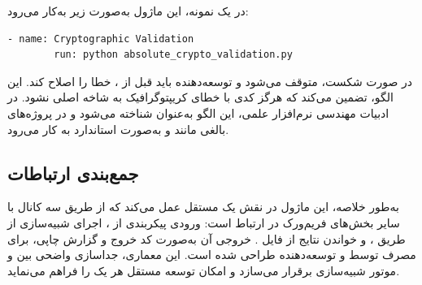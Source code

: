 در یک  نمونه، این ماژول به‌صورت زیر به‌کار می‌رود:

\begin{LTR}
	\begin{lstlisting}[language=bash]
		- name: Cryptographic Validation
		run: python absolute_crypto_validation.py
	\end{lstlisting}
\end{LTR}

در صورت شکست،  متوقف می‌شود و توسعه‌دهنده باید قبل از ، خطا را اصلاح کند. این الگو، تضمین می‌کند که هرگز کدی با خطای کریپتوگرافیک به شاخه اصلی  نشود. در ادبیات مهندسی نرم‌افزار علمی، این الگو به‌عنوان  شناخته می‌شود و در پروژه‌های بالغی مانند  و  به‌صورت استاندارد به کار می‌رود.

\subsection{جمع‌بندی ارتباطات}

به‌طور خلاصه، این ماژول در نقش یک  مستقل عمل می‌کند که از طریق سه کانال با سایر بخش‌های فریم‌ورک در ارتباط است: ورودی پیکربندی از ، اجرای شبیه‌سازی از طریق ، و خواندن نتایج از فایل . خروجی آن به‌صورت کد خروج  و گزارش چاپی، برای مصرف توسط  و توسعه‌دهنده طراحی شده است. این معماری، جداسازی واضحی بین  و موتور شبیه‌سازی برقرار می‌سازد و امکان توسعه مستقل هر یک را فراهم می‌نماید.
